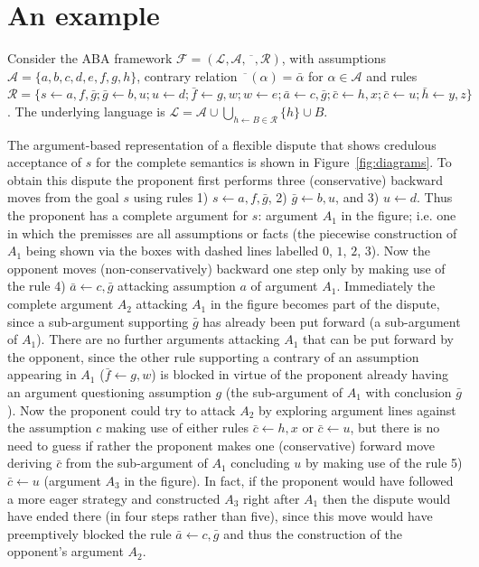 \documentclass[conference]{IEEEtran}
\newtheorem{example}{Example}[section]
\newcommand{\frF}{\ensuremath{\mathcal{F}}\xspace}
\newcommand{\frL}{\ensuremath{\mathcal{L}}\xspace}
\newcommand{\frA}{\ensuremath{\mathcal{A}}\xspace}
\newcommand{\frCtr}{\ensuremath{\overline{\phantom{x}}}\xspace}
\newcommand{\frR}{\ensuremath{\mathcal{R}}\xspace}
\newcommand{\frTup}{\ensuremath{(\frL,\frA,\frCtr,\frR)}\xspace}
\newcommand{\fr}{\ensuremath{\frF = \frTup}\xspace}
\newcommand{\rulH}{\ensuremath{h}\xspace}
\newcommand{\rulB}{\ensuremath{B}\xspace}
\newcommand{\rul}{\ensuremath{\rulH \leftarrow \rulB}\xspace}
\newcommand{\rulA}[2]{\ensuremath{#1 \leftarrow #2}\xspace}
\begin{document}
\section{An example}



Consider the ABA framework \fr, with assumptions $\frA = \{ a,b,c,d,e,f,g,h \}$, contrary relation $\frCtr(\alpha) = \bar{\alpha}$ for $\alpha \in \frA$ and rules $\frR = \{ \rulA{s}{a,f,\bar{g}}; \rulA{\bar{g}}{b,u}; \rulA{u}{d}; \rulA{\bar{f}}{g,w}; \rulA{w}{e};\rulA{\bar{a}}{c,\bar{g}};\rulA{\bar{c}}{h,x};\rulA{\bar{c}}{u};\rulA{\bar{h}}{y,z} \}$.  The underlying language is $\frL = \frA \cup \bigcup_{\rul \in \frR} \{ \rulH \} \cup \rulB$. 

The argument-based representation of a flexible dispute that shows credulous acceptance of $s$ for the complete semantics is shown in Figure~\ref{fig:diagrams}. To obtain this dispute the proponent first performs three (conservative) backward moves from the goal $s$ using rules 1) $\rulA{s}{a,f,\bar{g}}$, 2) $\rulA{\bar{g}}{b,u}$, and  3) $\rulA{u}{d}$. Thus the proponent has a complete argument for $s$: argument $A_1$ in the figure; i.e. one in which the premisses are all assumptions or facts (the piecewise construction of $A_1$ being shown via the boxes with dashed lines labelled $0$, $1$, $2$, $3$).  Now the opponent moves (non-conservatively) backward one step only by making use of the rule 4) $\rulA{\bar{a}}{c,\bar{g}}$ attacking assumption $a$ of argument $A_1$.  Immediately the complete argument $A_2$ attacking $A_1$ in the figure becomes part of the dispute, since a sub-argument supporting $\bar{g}$ has already been put forward (a sub-argument of $A_1$).  There are no further arguments attacking $A_1$ that can be put forward by the opponent, since the other rule supporting a contrary of an assumption appearing in $A_1$ ($\rulA{\bar{f}}{g,w}$) is blocked in virtue of the proponent already having an argument questioning assumption $g$ (the sub-argument of $A_1$ with conclusion $\bar{g}$).  Now the proponent could try to attack $A_2$ by exploring argument lines against the assumption $c$ making use of either rules $\rulA{\bar{c}}{h,x}$ or $\rulA{\bar{c}}{u}$, but there is no need to guess if rather the proponent makes one (conservative) forward move deriving $\bar{c}$ from the sub-argument of $A_1$ concluding $u$ by making use of the rule 5) $\rulA{\bar{c}}{u}$ (argument $A_3$ in the figure). In fact, if the proponent would have followed a more eager strategy and constructed $A_3$ right after $A_1$ then the dispute would have ended there (in four steps rather than five), since this move would have preemptively blocked the rule $\rulA{\bar{a}}{c,\bar{g}}$ and thus the construction of the opponent's argument $A_2$.   
\end{document}
